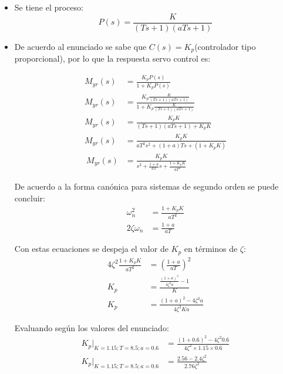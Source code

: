 \begin{ejercicio}

  \begin{itemize}
    \item 
    Se tiene el proceso:
    \begin{equation*}
      P(s) = \frac{K}{(Ts+1)(aTs+1)}
    \end{equation*}

    \item
    De acuerdo al enunciado se sabe que $C(s) = K_p$(controlador tipo proporcional), por lo que la respuesta servo control es:

    \begin{align*}
      M_{yr}(s) &= \frac{K_p P(s)}{1 + K_p P(s)}
      \\
      M_{yr}(s) &= \frac{K_p \frac{K}{(Ts+1)(aTs+1)}}{1 + K_p \frac{K}{(Ts+1)(aTs+1)}}
      \\
      M_{yr}(s) &= \frac{K_p K}{(Ts+1)(aTs+1) + K_p K}
      \\
      M_{yr}(s) &= \frac{K_p K}{a T^2 s^2 + (1+a)Ts + (1 + K_p K)}
      \\\
      M_{yr}(s) &= \frac{K_p K}{s^2 + \frac{1+a}{aT}s + \frac{1 + K_p K}{aT^2}}
    \end{align*}

    De acuerdo a la forma canónica para sistemas de segundo orden se puede concluir:
    \begin{align*}
      \omega_n^2 &= \frac{1 + K_p K}{aT^2}
      \\
      2\zeta \omega_n &= \frac{1+a}{aT}
    \end{align*}

    Con estas ecuaciones se despeja el valor de $K_p$ en términos de $\zeta$:
    \begin{align*}
      4\zeta^2 \frac{1 + K_p K}{aT^2} &= \left(\frac{1+a}{aT}\right)^2
      \\
      K_p &= \frac{\frac{(1+a)^2}{4 \zeta^2 a}-1}{K}
      \\
      K_p &= \frac{(1+a)^2-4 \zeta^2 a}{4 \zeta^2 K a }
    \end{align*}

    Evaluando según los valores del enunciado:
    \begin{align*}
      K_p|_{K=1.15; T=8.5; a=0.6} &= \frac{(1+0.6)^2-4 \zeta^2 0.6}{4 \zeta^2 \times 1.15 \times 0.6}
      \\
      K_p|_{K=1.15; T=8.5; a=0.6} &= \frac{2.56 - 2.4 \zeta^2 }{2.76 \zeta^2 }
    \end{align*}


\end{itemize}
\end{ejercicio}
